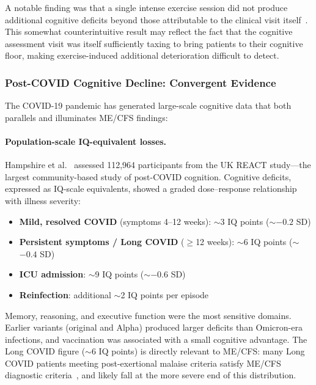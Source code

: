 A notable finding was that a single intense exercise session did not produce additional cognitive deficits beyond those attributable to the clinical visit itself~\cite{Lange2024cognitive}. This somewhat counterintuitive result may reflect the fact that the cognitive assessment visit was itself sufficiently taxing to bring patients to their cognitive floor, making exercise-induced additional deterioration difficult to detect.

\subsubsection{Post-COVID Cognitive Decline: Convergent Evidence}
\label{subsubsec:postcovid-cognitive}

The COVID-19 pandemic has generated large-scale cognitive data that both parallels and illuminates ME/CFS findings:

\paragraph{Population-scale IQ-equivalent losses.} Hampshire et al.~\cite{Hampshire2024cognition} assessed 112,964 participants from the UK REACT study---the largest community-based study of post-COVID cognition. Cognitive deficits, expressed as IQ-scale equivalents, showed a graded dose--response relationship with illness severity:

\begin{itemize}
    \item \textbf{Mild, resolved COVID} (symptoms 4--12 weeks): $\sim$3 IQ points ($\sim$$-0.2$ SD)
    \item \textbf{Persistent symptoms / Long COVID} ($\geq$12 weeks): $\sim$6 IQ points ($\sim$$-0.4$ SD)
    \item \textbf{ICU admission}: $\sim$9 IQ points ($\sim$$-0.6$ SD)
    \item \textbf{Reinfection}: additional $\sim$2 IQ points per episode
\end{itemize}

Memory, reasoning, and executive function were the most sensitive domains. Earlier variants (original and Alpha) produced larger deficits than Omicron-era infections, and vaccination was associated with a small cognitive advantage. The Long COVID figure ($\sim$6 IQ points) is directly relevant to ME/CFS: many Long COVID patients meeting post-exertional malaise criteria satisfy ME/CFS diagnostic criteria~\cite{Komaroff2023}, and likely fall at the more severe end of this distribution.


